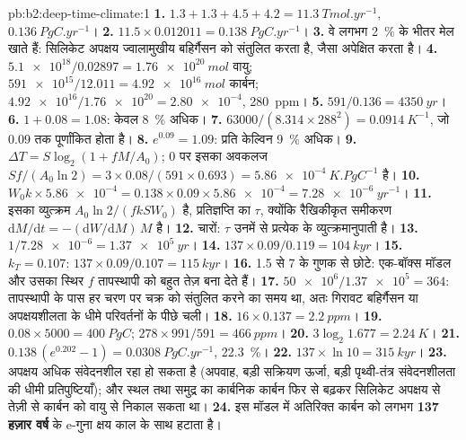 \begin{solution}{pb:b2:deep-time-climate:1}
\textbf{1.} $1.3 + 1.3 + 4.5 + 4.2 = \qty{11.3}{Tmol.yr^{-1}}$, $\qty{0.136}{PgC.yr^{-1}}$।
\textbf{2.} $11.5\times0.012011 = \qty{0.138}{PgC.yr^{-1}}$।
\textbf{3.} वे लगभग \qty{2}{\percent} के भीतर मेल खाते हैं: सिलिकेट अपक्षय ज्वालामुखीय बहिर्गैसन को
संतुलित करता है, जैसा  अपेक्षित करता है।
\textbf{4.} $\num{5.1e18}/0.02897 = \qty{1.76e20}{mol}$ वायु; $\num{591e15}/12.011 =
\qty{4.92e16}{mol}$ कार्बन; $\num{4.92e16}/\num{1.76e20} = \num{2.80e-4}$, \qty{280}{ppm}।
\textbf{5.} $591/0.136 = \qty{4350}{yr}$।
\textbf{6.} $1 + 0.08 = 1.08$: केवल \qty{8}{\percent} अधिक।
\textbf{7.} $63000/(8.314\times288^2) = \qty{0.0914}{K^{-1}}$, जो 0.09 तक पूर्णांकित होता है।
\textbf{8.} $e^{0.09} = 1.09$: प्रति केल्विन \qty{9}{\percent} अधिक।
\textbf{9.} $\Delta T = S\log_2(1 + fM/A_0)$; 0 पर इसका अवकलज $Sf/(A_0\ln2) =
3\times0.08/(591\times0.693) = \qty{5.86e-4}{K.PgC^{-1}}$ है।
\textbf{10.} $W_0k\times\num{5.86e-4} = 0.138\times0.09\times\num{5.86e-4} = \qty{7.28e-6}{yr^{-1}}$।
\textbf{11.} इसका व्युत्क्रम $A_0\ln2/(fkSW_0)$ है, प्रतिज्ञप्ति का $\tau$, क्योंकि
रैखिकीकृत समीकरण $\mathrm dM/\mathrm dt = -(\mathrm dW/\mathrm dM)\,M$ है।
\textbf{12.} चारों: $\tau$ उनमें से प्रत्येक के व्युत्क्रमानुपाती है।
\textbf{13.} $1/\num{7.28e-6} = \qty{1.37e5}{yr}$।
\textbf{14.} $137\times0.09/0.119 = \qty{104}{kyr}$।
\textbf{15.} $k_T = 0.107$: $137\times0.09/0.107 = \qty{115}{kyr}$।
\textbf{16.} 1.5 से 7 के गुणक से छोटे: एक-बॉक्स मॉडल और उसका स्थिर $f$ तापस्थापी को
बहुत तेज़ बना देते हैं।
\textbf{17.} $\num{50e6}/\num{1.37e5} = 364$: तापस्थापी के पास हर चरण पर चक्र को संतुलित करने का
समय था, अतः गिरावट बहिर्गैसन या अपक्षयशीलता के धीमे परिवर्तनों के पीछे चली।
\textbf{18.} $16\times0.137 = \qty{2.2}{ppm}$।
\textbf{19.} $0.08\times5000 = \qty{400}{PgC}$; $278\times991/591 = \qty{466}{ppm}$।
\textbf{20.} $3\log_2 1.677 = \qty{2.24}{K}$।
\textbf{21.} $0.138\,(e^{0.202} - 1) = \qty{0.0308}{PgC.yr^{-1}}$, \qty{22.3}{\percent}।
\textbf{22.} $137\times\ln10 = \qty{315}{kyr}$।
\textbf{23.} अपक्षय अधिक संवेदनशील रहा हो सकता है (अपवाह, बड़ी सक्रियण ऊर्जा, बड़ी पृथ्वी-तंत्र
संवेदनशीलता की धीमी प्रतिपुष्टियाँ); और स्थल तथा समुद्र का कार्बनिक कार्बन फिर से बढ़कर
सिलिकेट अपक्षय से तेज़ी से कार्बन को वायु से निकाल सकता था।
\textbf{24.} इस मॉडल में  अतिरिक्त कार्बन को लगभग
\textbf{\qty[text-series-to-math=true]{137}{} हज़ार वर्ष} के e-गुना क्षय काल के साथ हटाता है।
\end{solution}
